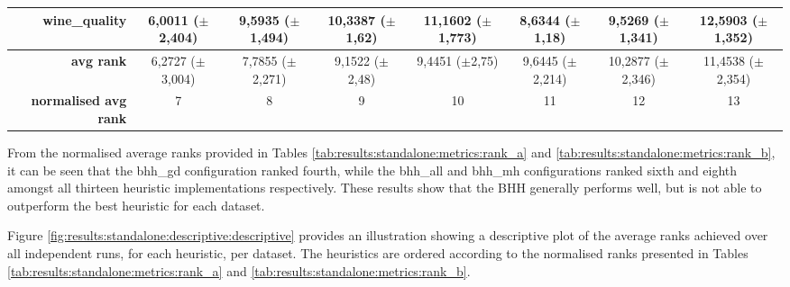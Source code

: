 \begin{table}[htb]
{\begin{tabular}{r|c|c|ccccc|}
			\textbf{wine\_quality}        & \cellcolor[rgb]{ 1,  .922,  .518}6,0011 ($\pm$2,404)                              & \cellcolor[rgb]{ .988,  .647,  .467}9,5935 ($\pm$1,494) & \cellcolor[rgb]{ .984,  .588,  .455}10,3387 ($\pm$1,62)  & \cellcolor[rgb]{ .98,  .525,  .443}11,1602 ($\pm$1,773)  & \cellcolor[rgb]{ .992,  .722,  .482}8,6344 ($\pm$1,18)   & \cellcolor[rgb]{ .988,  .651,  .467}9,5269 ($\pm$1,341)  & \cellcolor[rgb]{ .973,  .412,  .42}12,5903 ($\pm$1,352)  \\
			\midrule
			\textbf{avg rank}             & \cellcolor[rgb]{ 1,  .922,  .518}6,2727 ($\pm$3,004)                              & \cellcolor[rgb]{ .992,  .776,  .49}7,7855 ($\pm$2,271)  & \cellcolor[rgb]{ .988,  .639,  .467}9,1522 ($\pm$2,48)   & \cellcolor[rgb]{ .984,  .612,  .459}9,4451 ($\pm$2,75)   & \cellcolor[rgb]{ .984,  .592,  .455}9,6445 ($\pm$2,214)  & \cellcolor[rgb]{ .98,  .529,  .443}10,2877 ($\pm$2,346)  & \cellcolor[rgb]{ .973,  .412,  .42}11,4538 ($\pm$2,354)  \\
			\midrule
			\textbf{normalised avg rank}  & \cellcolor[rgb]{ 1,  .922,  .518}7                                                & \cellcolor[rgb]{ .996,  .839,  .502}8                   & \cellcolor[rgb]{ .992,  .753,  .486}9                    & \cellcolor[rgb]{ .988,  .667,  .471}10                   & \cellcolor[rgb]{ .984,  .584,  .455}11                   & \cellcolor[rgb]{ .98,  .498,  .439}12                    & \cellcolor[rgb]{ .973,  .412,  .42}13                    \\
			\cmidrule{3-3}\end{tabular}%
	}
\end{table}%

From the normalised average ranks provided in Tables \ref{tab:results:standalone:metrics:rank_a} and \ref{tab:results:standalone:metrics:rank_b}, it can be seen that the bhh\_gd configuration ranked fourth, while the bhh\_all and bhh\_mh configurations ranked sixth and eighth amongst all thirteen heuristic implementations respectively. These results show that the \acs{BHH} generally performs well, but is not able to outperform the best heuristic for each dataset.

Figure \ref{fig:results:standalone:descriptive:descriptive} provides an illustration showing a descriptive plot of the average ranks achieved over all independent runs, for each heuristic, per dataset. The heuristics are ordered according to the normalised ranks presented in Tables \ref{tab:results:standalone:metrics:rank_a} and \ref{tab:results:standalone:metrics:rank_b}.

